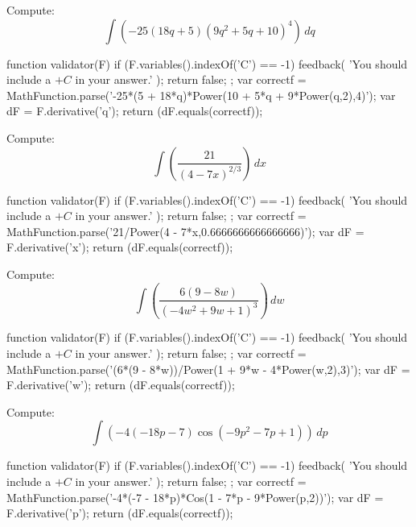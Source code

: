 \documentclass{ximera}
\renewcommand{\d}{\, d}
\begin{document}
\begin{exercise}
Compute: 
\[
\int \left(-25 (18 q+5) \left(9 q^2+5 q+10\right)^4\right)\d q
\]
\begin{expressionAnswer}
     function validator(F) {
      if (F.variables().indexOf('C') == -1) {
        feedback( 'You should include a $+C$ in your answer.' );
        return false;
      };      
      var correctf = MathFunction.parse('-25*(5 + 18*q)*Power(10 + 5*q + 9*Power(q,2),4)');
      var dF = F.derivative('q');
      return (dF.equals(correctf));
    }
\end{expressionAnswer}
\end{exercise}



\begin{exercise}
Compute: 
\[
\int \left(\frac{21}{(4-7 x)^{2/3}}\right)\d x
\]
\begin{expressionAnswer}
     function validator(F) {
      if (F.variables().indexOf('C') == -1) {
        feedback( 'You should include a $+C$ in your answer.' );
        return false;
      };      
      var correctf = MathFunction.parse('21/Power(4 - 7*x,0.6666666666666666)');
      var dF = F.derivative('x');
      return (dF.equals(correctf));
    }
\end{expressionAnswer}
\end{exercise}



\begin{exercise}
Compute: 
\[
\int \left(\frac{6 (9-8 w)}{\left(-4 w^2+9 w+1\right)^3}\right)\d w
\]
\begin{expressionAnswer}
     function validator(F) {
      if (F.variables().indexOf('C') == -1) {
        feedback( 'You should include a $+C$ in your answer.' );
        return false;
      };      
      var correctf = MathFunction.parse('(6*(9 - 8*w))/Power(1 + 9*w - 4*Power(w,2),3)');
      var dF = F.derivative('w');
      return (dF.equals(correctf));
    }
\end{expressionAnswer}
\end{exercise}



\begin{exercise}
Compute: 
\[
\int \left(-4 (-18 p-7) \cos \left(-9 p^2-7 p+1\right)\right)\d p
\]
\begin{expressionAnswer}
     function validator(F) {
      if (F.variables().indexOf('C') == -1) {
        feedback( 'You should include a $+C$ in your answer.' );
        return false;
      };      
      var correctf = MathFunction.parse('-4*(-7 - 18*p)*Cos(1 - 7*p - 9*Power(p,2))');
      var dF = F.derivative('p');
      return (dF.equals(correctf));
    }
\end{expressionAnswer}
\end{exercise}
\end{document}
